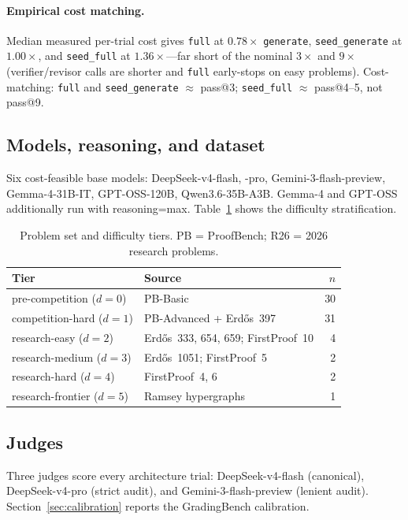 \documentclass{article}
\begin{document}
\paragraph{Empirical cost matching.}
Median measured per-trial cost gives \texttt{full} at $0.78\times$
\texttt{generate}, \texttt{seed\_generate} at $1.00\times$, and \texttt{seed\_full}
at $1.36\times$---far short of the nominal $3\times$ and $9\times$ (verifier/revisor
calls are shorter and \texttt{full} early-stops on easy problems).
Cost-matching: \texttt{full} and \texttt{seed\_generate} $\approx$ pass@3;
\texttt{seed\_full} $\approx$ pass@4--5, not pass@9.

\subsection{Models, reasoning, and dataset}

Six cost-feasible base models: DeepSeek-v4-flash, -pro, Gemini-3-flash-preview,
Gemma-4-31B-IT, GPT-OSS-120B, Qwen3.6-35B-A3B.
Gemma-4 and GPT-OSS additionally run with reasoning=max.
Table~\ref{tab:tiers} shows the difficulty stratification.

\begin{table}[t]
  \caption{Problem set and difficulty tiers. PB = ProofBench; R26 = 2026 research problems.}
  \label{tab:tiers}
  \centering
  \small
  \begin{tabular}{llr}
    \toprule
    Tier & Source & $n$ \\
    \midrule
    pre-competition ($d{=}0$) & PB-Basic & 30 \\
    competition-hard ($d{=}1$) & PB-Advanced + Erd\H{o}s~397 & 31 \\
    research-easy ($d{=}2$) & Erd\H{o}s~333, 654, 659; FirstProof~10 & 4 \\
    research-medium ($d{=}3$) & Erd\H{o}s~1051; FirstProof~5 & 2 \\
    research-hard ($d{=}4$) & FirstProof~4, 6 & 2 \\
    research-frontier ($d{=}5$) & Ramsey hypergraphs & 1 \\
    \bottomrule
  \end{tabular}
\end{table}

\subsection{Judges}

Three judges score every architecture trial: DeepSeek-v4-flash (canonical),
DeepSeek-v4-pro (strict audit), and Gemini-3-flash-preview (lenient audit).
Section~\ref{sec:calibration} reports the GradingBench calibration.
\end{document}
